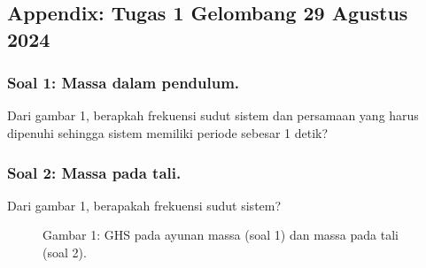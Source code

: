 \documentclass[10pt]{article}
\begin{document}
\subsection*{Appendix: Tugas 1 Gelombang 29 Agustus 2024}
\subsubsection*{Soal 1: Massa dalam pendulum.} Dari gambar 1, berapkah frekuensi sudut sistem dan persamaan yang harus dipenuhi sehingga sistem memiliki periode sebesar 1 detik?
\subsubsection*{Soal 2: Massa pada tali.} Dari gambar 1, berapakah frekuensi sudut sistem?
\begin{figure}[h]
    \centering
    
    
    \caption*{Gambar 1: GHS pada ayunan massa (soal 1) dan massa pada tali (soal 2).}
  \end{figure}
\end{document}
